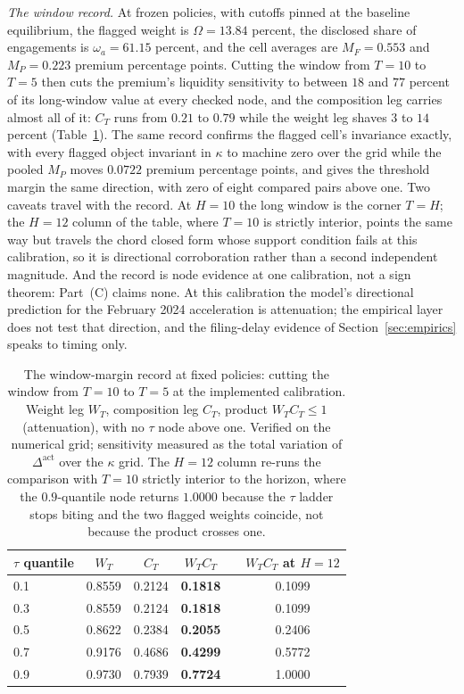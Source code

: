 \documentclass[11pt]{article}
\newcommand{\Dact}{\Delta^{\mathrm{act}}}
\begin{document}
\emph{The window record.} At frozen policies, with cutoffs pinned at the baseline equilibrium, the
flagged weight is $\Omega = 13.84$ percent, the disclosed share of engagements is $\omega_a =
61.15$ percent, and the cell averages are $M_F = 0.553$ and $M_P = 0.223$ premium percentage
points. Cutting the window from $T=10$ to $T=5$ then cuts the premium's liquidity sensitivity to
between $18$ and $77$ percent of its long-window value at every checked node, and the composition
leg carries almost all of it: $C_T$ runs from $0.21$ to $0.79$ while the weight leg shaves $3$ to
$14$ percent (Table~\ref{tab:window-record}). The same record confirms the flagged cell's
invariance exactly, with every flagged object invariant in $\kappa$ to machine zero over the grid
while the pooled $M_P$ moves $0.0722$ premium percentage points, and gives the threshold margin
the same direction, with zero of eight compared pairs above one. Two caveats travel with the
record. At $H = 10$ the long window is the corner $T = H$; the $H = 12$ column of the table, where
$T = 10$ is strictly interior, points the same way but travels the chord closed form whose support
condition fails at this calibration, so it is directional corroboration rather than a second
independent magnitude. And the record is node evidence at one calibration, not a sign theorem:
Part~(C) claims none. At this calibration the model's directional prediction for the February 2024
acceleration is attenuation; the empirical layer does not test that direction, and the
filing-delay evidence of Section~\ref{sec:empirics} speaks to timing only.

\begin{table}[H]
\centering
\caption{The window-margin record at fixed policies: cutting the window from $T=10$ to $T=5$ at the
implemented calibration. Weight leg $W_T$, composition leg $C_T$, product $W_T C_T \le 1$
(attenuation), with no $\tau$ node above one. Verified on the numerical grid; sensitivity measured as the total variation of
$\Dact$ over the $\kappa$ grid. The $H = 12$ column re-runs the comparison with $T = 10$ strictly
interior to the horizon, where the $0.9$-quantile node returns $1.0000$ because the $\tau$
ladder stops biting and the two flagged weights coincide, not because the product crosses one.}
\label{tab:window-record}
\begin{tabular}{lcccc c}
\toprule
$\tau$ quantile & $W_T$ & $C_T$ & $W_T C_T$ & \quad & $W_T C_T$ at $H = 12$ \\
\midrule
0.1 & 0.8559 & 0.2124 & \textbf{0.1818} & & 0.1099 \\
0.3 & 0.8559 & 0.2124 & \textbf{0.1818} & & 0.1099 \\
0.5 & 0.8622 & 0.2384 & \textbf{0.2055} & & 0.2406 \\
0.7 & 0.9176 & 0.4686 & \textbf{0.4299} & & 0.5772 \\
0.9 & 0.9730 & 0.7939 & \textbf{0.7724} & & 1.0000 \\
\bottomrule
\end{tabular}
\end{table}
\end{document}
